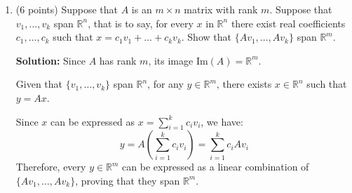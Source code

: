 \documentclass[12pt]{article}
\newcommand{\qspace}{\vspace{1em}} %
\newenvironment{solution}{\noindent\textbf{Solution:} }{\qspace}
\begin{document}
\begin{enumerate}
\begin{enumerate}
        \item (6 points) Show that if \( A \) and \( B \) are \( 2 \times 2 \) matrices with integer entries, and \( A, A+B, A+2B, A+3B, \) and \( A+4B \) all have inverses with integer entries, then the same is true for \( A + tB \) for all integers \( t \). (Hint: consider \( \det(A + tB) \) as a polynomial in \( t \). Show that it is always equal to \( 1 \) or \( -1 \).)
        
        \begin{solution}
        Consider \( \det(A + tB) \) for \( t = 0, 1, 2, 3, 4 \). Given that \( A + tB \) is invertible with integer entries, \( \det(A + tB) = \pm 1 \) for these values of \( t \).

        Since \( \det(A + tB) \) is a quadratic polynomial in \( t \) (for \( 2 \times 2 \) matrices), and it takes the value \( \pm 1 \) at five distinct integer points (\( t = 0,1,2,3,4 \)), the polynomial must be constant (a non-constant quadratic cannot take the same value at five distinct points). Therefore, \( \det(A + tB) = \pm 1 \) for all integers \( t \).

        Consequently, \( A + tB \) is invertible with integer entries for all integers \( t \).
        \end{solution}
    \end{enumerate}
    
    \item (6 points) Suppose that \( A \) is an \( m \times n \) matrix with rank \( m \). Suppose that \( v_1, \ldots, v_k \) span \( \mathbb{R}^n \), that is to say, for every \( x \) in \( \mathbb{R}^n \) there exist real coefficients \( c_1, \ldots, c_k \) such that \( x = c_1 v_1 + \ldots + c_k v_k \). Show that \( \{ A v_1, \ldots, A v_k \} \) span \( \mathbb{R}^m \).
    
    \begin{solution}
    Since \( A \) has rank \( m \), its image \( \text{Im}(A) = \mathbb{R}^m \).

    Given that \( \{ v_1, \ldots, v_k \} \) span \( \mathbb{R}^n \), for any \( y \in \mathbb{R}^m \), there exists \( x \in \mathbb{R}^n \) such that \( y = Ax \).

    Since \( x \) can be expressed as \( x = \sum_{i=1}^k c_i v_i \), we have:
    \[
    y = A\left( \sum_{i=1}^k c_i v_i \right) = \sum_{i=1}^k c_i A v_i
    \]
    Therefore, every \( y \in \mathbb{R}^m \) can be expressed as a linear combination of \( \{ A v_1, \ldots, A v_k \} \), proving that they span \( \mathbb{R}^m \).
    \end{solution}
    

\end{enumerate}
\end{document}

